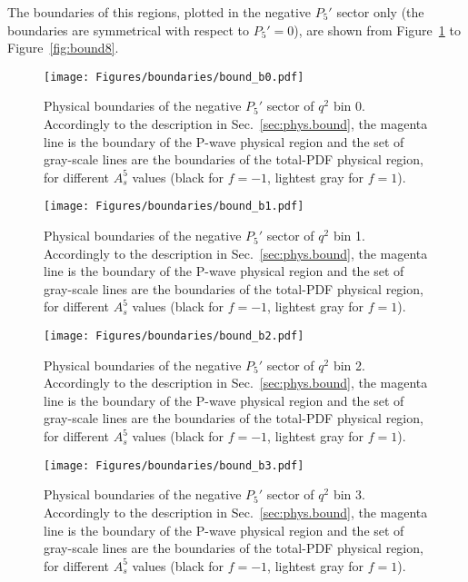 The boundaries of this regions, plotted in the negative $P_5'$ sector only (the boundaries are symmetrical with respect to $P_5'=0$), are shown from Figure~\ref{fig:bound0} to Figure~\ref{fig:bound8}.

\begin{figure}[!hbt]
  \centering
  \texttt{[image: Figures/boundaries/bound\_b0.pdf]}
  \caption{Physical boundaries of the negative $P_5'$ sector of $q^2$ bin 0. Accordingly to the description in Sec.~\ref{sec:phys.bound}, the magenta line is the boundary of the P-wave physical region and the set of gray-scale lines are the boundaries of the total-PDF physical region, for different $A_s^5$ values (black for $f=-1$, lightest gray for $f=1$).}
  \label{fig:bound0}
\end{figure}

\begin{figure}[!hbt]
  \centering
  \texttt{[image: Figures/boundaries/bound\_b1.pdf]}
  \caption{Physical boundaries of the negative $P_5'$ sector of $q^2$ bin 1. Accordingly to the description in Sec.~\ref{sec:phys.bound}, the magenta line is the boundary of the P-wave physical region and the set of gray-scale lines are the boundaries of the total-PDF physical region, for different $A_s^5$ values (black for $f=-1$, lightest gray for $f=1$).}
  \label{fig:bound1}
\end{figure}

\begin{figure}[!hbt]
  \centering
  \texttt{[image: Figures/boundaries/bound\_b2.pdf]}
  \caption{Physical boundaries of the negative $P_5'$ sector of $q^2$ bin 2. Accordingly to the description in Sec.~\ref{sec:phys.bound}, the magenta line is the boundary of the P-wave physical region and the set of gray-scale lines are the boundaries of the total-PDF physical region, for different $A_s^5$ values (black for $f=-1$, lightest gray for $f=1$).}
  \label{fig:bound2}
\end{figure}

\begin{figure}[!hbt]
  \centering
  \texttt{[image: Figures/boundaries/bound\_b3.pdf]}
  \caption{Physical boundaries of the negative $P_5'$ sector of $q^2$ bin 3. Accordingly to the description in Sec.~\ref{sec:phys.bound}, the magenta line is the boundary of the P-wave physical region and the set of gray-scale lines are the boundaries of the total-PDF physical region, for different $A_s^5$ values (black for $f=-1$, lightest gray for $f=1$).}
  \label{fig:bound3}
\end{figure}

